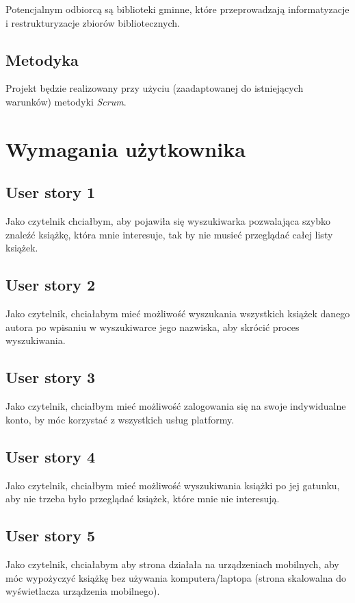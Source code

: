 \documentclass[a4paper]{article}
\begin{document}
Potencjalnym odbiorcą są biblioteki gminne, które przeprowadzają informatyzacje i restrukturyzacje zbiorów bibliotecznych.

\subsection{Metodyka}

Projekt będzie realizowany przy użyciu (zaadaptowanej do istniejących warunków) metodyki {\em Scrum}. 

\section{Wymagania użytkownika}

\subsection{User story 1}
Jako czytelnik chciałbym, aby pojawiła się wyszukiwarka pozwalająca szybko znaleźć książkę, która mnie interesuje, tak by nie musieć przeglądać całej listy książek.

\subsection{User story 2}
Jako czytelnik, chciałabym mieć możliwość wyszukania wszystkich książek danego autora po wpisaniu w wyszukiwarce jego nazwiska, aby skrócić proces wyszukiwania.

\subsection{User story 3}
Jako czytelnik, chciałbym mieć możliwość zalogowania się na swoje indywidualne konto, by móc korzystać z wszystkich usług platformy.

\subsection{User story 4}
Jako czytelnik, chciałbym mieć możliwość wyszukiwania książki po jej gatunku, aby nie trzeba było przeglądać książek, które mnie nie interesują.

\subsection{User story 5}
Jako czytelnik, chciałabym aby strona działała na urządzeniach mobilnych, aby móc wypożyczyć książkę bez używania komputera/laptopa (strona skalowalna do wyświetlacza urządzenia mobilnego).
\end{document}
